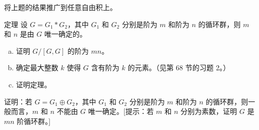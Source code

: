 \documentclass[../../main.tex]{subfiles}
\begin{document}
\begin{exercise}\label{exercise:ch11-69-02}
将上题的结果推广到任意自由积上。
\end{exercise}

\begin{exercise}\label{exercise:ch11-69-03}
定理 设 $G=G_1*G_2$，其中 $G_1$ 和 $G_2$ 分别是阶为 $m$ 和阶为 $n$ 的循环群，则 $m$ 和 $n$ 是由 $G$ 唯一确定的。
\begin{enumerate}[(a)]
\item 证明 $G/[G,G]$ 的阶为 $mn$。
\item 确定最大整数 $k$ 使得 $G$ 含有阶为 $k$ 的元素。（见第 68 节的习题 2。）
\item 证明定理。
\end{enumerate}
\end{exercise}

\begin{exercise}\label{exercise:ch11-69-04}
证明：若 $G=G_1\oplus G_2$，其中 $G_1$ 和 $G_2$ 分别是阶为 $m$ 和阶为 $n$ 的循环群，则一般而言，$m$ 和 $n$ 不能由 $G$ 唯一确定。[提示：若 $m$ 和 $n$ 分别为素数，证明 $G$ 是 $mn$ 阶循环群。]
\end{exercise}
\end{document}
